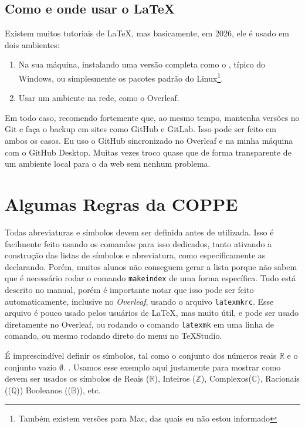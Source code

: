 \documentclass[dsc,pdfa]{coppe}
\begin{document}
\section{Como e onde usar o \LaTeX}

  Existem muitos tutoriais de \LaTeX, mas basicamente, em 2026, ele é usado em dois ambientes:
  \begin{enumerate}
  \item Na sua máquina, instalando uma versão completa como o , típico do Windows, ou simplesmente os pacotes padrão do Linux\footnote{Também existem versões para Mac, das quais eu não estou informado}.
  \item Usar um ambiente na rede, como o Overleaf.
  \end{enumerate}

  Em todo caso, recomendo fortemente que, ao mesmo tempo, mantenha versões no Git e faça o backup em sites como GitHub e GitLab. Isso pode ser feito em ambos os casos. Eu uso o GitHub sincronizado no Overleaf e na minha máquina com o GitHub Desktop. Muitas vezes troco quase que de forma transparente de um ambiente local para o da web sem nenhum problema.

\chapter{Algumas Regras da COPPE}

  Todas abreviaturas e símbolos devem ser definida antes de utilizada. Isso é facilmente feito usando os comandos para isso dedicados, tanto ativando a construção das listas de símbolos e abreviatura, como especificamente as declarando. Porém, muitos alunos não conseguem gerar a lista porque não sabem que é necessário rodar o comando \verb*|makeindex| de uma forma específica. Tudo está descrito no manual, porém é importante notar que isso pode ser feito automaticamente, inclusive no \textit{Overleaf}, usando o arquivo \verb*|latexmkrc|. Esse arquivo é pouco usado pelos usuários de \LaTeX, mas muito útil, e pode ser usado diretamente no Overleaf, ou rodando o comando \verb|latexmk| em uma linha de comando, ou mesmo rodando direto do menu no \TeX Studio.

  É imprescindível definir os símbolos, tal como o
  conjunto dos números reais $\mathbb{R}$ e o conjunto vazio $\emptyset$.
  . Usamos esse exemplo aqui justamente para mostrar como devem ser usados os símbolos de Reais ($\mathbb{R}$), Inteiros ($\mathbb{Z}$), Complexos($\mathbb{C}$), Racionais (($\mathbb{Q}$)) Booleanos (($\mathbb{B}$)), etc.
\end{document}
